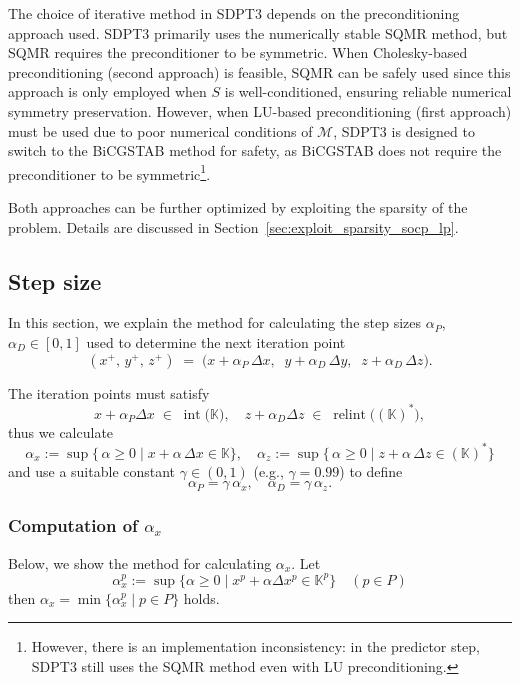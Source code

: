 The choice of iterative method in SDPT3 depends on the preconditioning approach used.
SDPT3 primarily uses the numerically stable SQMR method, but SQMR requires the preconditioner to be symmetric.
When Cholesky-based preconditioning (second approach) is feasible, SQMR can be safely used since this approach is only employed when $S$ is well-conditioned, ensuring reliable numerical symmetry preservation.
However, when LU-based preconditioning (first approach) must be used due to poor numerical conditions of $\mathcal{M}$, SDPT3 is designed to switch to the BiCGSTAB method for safety, as BiCGSTAB does not require the preconditioner to be symmetric\footnote{However, there is an implementation inconsistency: in the predictor step, SDPT3 still uses the SQMR method even with LU preconditioning.}.

Both approaches can be further optimized by exploiting the sparsity of the problem. 
Details are discussed in Section~\ref{sec:exploit_sparsity_socp_lp}.



\subsection{Step size} \label{sec:step_size}
In this section, we explain the method for calculating the step sizes $\alpha_P$, $\alpha_D \in [0, 1]$ used to determine the next iteration point 
\[
  (x^+,\,y^+,\,z^+) 
  \;=\; 
  \bigl(x + \alpha_P\,\Delta x,\;\; y + \alpha_D\,\Delta y,\;\; z + \alpha_D\,\Delta z\bigr).
\]

The iteration points must satisfy
\[
  x + \alpha_P \Delta x \;\in\; \operatorname{int}\bigl(\mathbb{K}\bigr),
  \quad
  z + \alpha_D \Delta z \;\in\; \operatorname{relint}\bigl((\mathbb{K})^*\bigr),
\]
thus we calculate
\[
  \alpha_x  := \sup \bigl\{\,\alpha \ge 0 \mid x + \alpha \,\Delta x \in \mathbb{K}\bigr\},
  \quad
  \alpha_z  := \sup \bigl\{\,\alpha \ge 0 \mid z + \alpha \,\Delta z \in (\mathbb{K})^*\bigr\}
\]
and use a suitable constant $\gamma\in(0,1)$ (e.g., $\gamma=0.99$) to define
\[
  \alpha_P 
    = \gamma \,\alpha_x, 
  \quad
  \alpha_D 
    = \gamma \,\alpha_z.
\]

\subsubsection{Computation of $\alpha_x$}
Below, we show the method for calculating $\alpha_x$.  
Let \[\alpha^p_x:=\sup\{\alpha \geq 0 \mid x^p + \alpha \Delta x^p \in \mathbb{K}^p\} \quad (p\in P)\]
then $\alpha_x=\min\{\alpha^p_x\mid p\in P\}$ holds.

